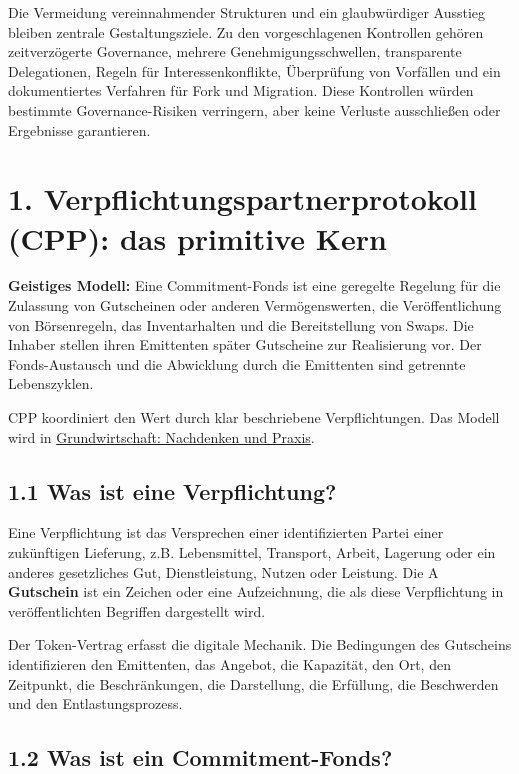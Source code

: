 \documentclass[11pt]{article}
\begin{document}
Die Vermeidung vereinnahmender Strukturen und ein glaubwürdiger Ausstieg bleiben zentrale Gestaltungsziele. Zu den vorgeschlagenen Kontrollen gehören zeitverzögerte Governance, mehrere Genehmigungsschwellen, transparente Delegationen, Regeln für Interessenkonflikte, Überprüfung von Vorfällen und ein dokumentiertes Verfahren für Fork und Migration. Diese Kontrollen würden bestimmte Governance-Risiken verringern, aber keine Verluste ausschließen oder Ergebnisse garantieren.


\section*{1. Verpflichtungspartnerprotokoll (CPP): das primitive Kern}

\textbf{Geistiges Modell:} Eine Commitment-Fonds ist eine geregelte Regelung für die Zulassung von Gutscheinen oder anderen Vermögenswerten, die Veröffentlichung von Börsenregeln, das Inventarhalten und die Bereitstellung von Swaps. Die Inhaber stellen ihren Emittenten später Gutscheine zur Realisierung vor. Der Fonds-Austausch und die Abwicklung durch die Emittenten sind getrennte Lebenszyklen.

CPP koordiniert den Wert durch klar beschriebene Verpflichtungen. Das Modell wird in \href{https://willruddick.substack.com/p/grassroots-economics-the-book-is}{Grundwirtschaft: Nachdenken und Praxis}.

\subsection*{1.1 Was ist eine Verpflichtung?}

Eine Verpflichtung ist das Versprechen einer identifizierten Partei einer zukünftigen Lieferung, z.B. Lebensmittel, Transport, Arbeit, Lagerung oder ein anderes gesetzliches Gut, Dienstleistung, Nutzen oder Leistung. Die A \textbf{Gutschein} ist ein Zeichen oder eine Aufzeichnung, die als diese Verpflichtung in veröffentlichten Begriffen dargestellt wird.

Der Token-Vertrag erfasst die digitale Mechanik. Die Bedingungen des Gutscheins identifizieren den Emittenten, das Angebot, die Kapazität, den Ort, den Zeitpunkt, die Beschränkungen, die Darstellung, die Erfüllung, die Beschwerden und den Entlastungsprozess.

\subsection*{1.2 Was ist ein Commitment-Fonds?}
\end{document}
